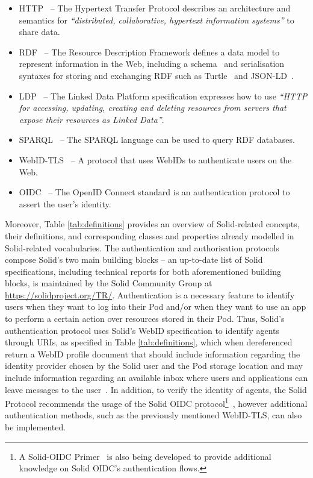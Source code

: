 \begin{itemize}
    \item HTTP~\citep{fielding_http_2022} -- The Hypertext Transfer Protocol describes an architecture and semantics for \textit{``distributed, collaborative, hypertext information systems''} to share data.
    \item RDF~\citep{cyganiak_rdf_2014} -- The Resource Description Framework defines a data model to represent information in the Web, including a schema~\citep{brickley_rdf_2014} and serialisation syntaxes for storing and exchanging RDF such as Turtle~\citep{prudhommeaux_rdf_2014} and JSON-LD~\citep{gregg_kellogg_json-ld_2020}.
    \item LDP~\citep{speicher_linked_2015} -- The Linked Data Platform specification expresses how to use \textit{``HTTP for accessing, updating, creating and deleting resources from servers that expose their resources as Linked Data''}.
    \item SPARQL~\citep{harris_sparql_2013} -- The SPARQL language can be used to query RDF databases. %
    \item WebID-TLS~\citep{story_webid-tls_2014} -- A protocol that uses WebIDs to authenticate users on the Web.
    \item OIDC~\citep{sakimura_openid_2014} -- The OpenID Connect standard is an authentication protocol to assert the user's identity. 
\end{itemize}

Moreover, Table \ref{tab:definitions} provides an overview of Solid-related concepts, their definitions, and corresponding classes and properties already modelled in Solid-related vocabularies.
The authentication and authorisation protocols compose Solid's two main building blocks -- an up-to-date list of Solid specifications, including technical reports for both aforementioned building blocks, is maintained by the Solid Community Group at \url{https://solidproject.org/TR/}.
Authentication is a necessary feature to identify users when they want to log into their Pod and/or when they want to use an app to perform a certain action over resources stored in their Pod.
Thus, Solid's authentication protocol uses Solid's WebID specification to identify agents through URIs, as specified in Table \ref{tab:definitions}, which when dereferenced return a WebID profile document that should include information regarding the identity provider chosen by the Solid user and the Pod storage location and may include information regarding an available inbox where users and applications can leave messages to the user~\citep{balseiro_solid_2022}.
In addition, to verify the identity of agents, the Solid Protocol recommends the usage of the Solid OIDC protocol\footnote{A Solid-OIDC Primer~\citep{morgan_oidcprimer_2022} is also being developed to provide additional knowledge on Solid OIDC's authentication flows.}~\citep{coburn_oidc_2022}, however additional authentication methods, such as the previously mentioned WebID-TLS, can also be implemented.

